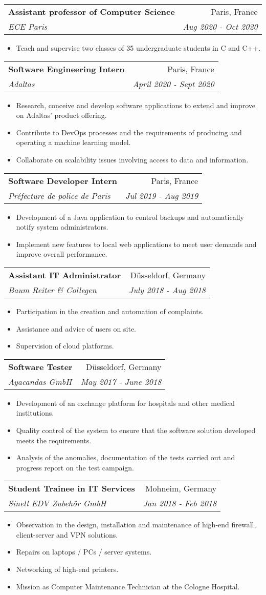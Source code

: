 \documentclass[a4paper,11pt]{article}
\makeatletter
\newcommand{\resumeItem}[2]{
  \item\small{
    \textbf{#1}{ #2 \vspace{-2pt}}
  }
}
\newcommand{\resumeSubheading}[4]{
  \vspace{-1pt}\item
    \begin{tabular*}{0.97\textwidth}{l@{\extracolsep{\fill}}r}
      \textbf{#1} & #2 \\
      \textit{\small#3} & \textit{\small #4} \\
    \end{tabular*}\vspace{-5pt}
}
\newcommand{\resumeItemListStart}{\begin{itemize}}
\newcommand{\resumeItemListEnd}{\end{itemize}\vspace{-5pt}}
\makeatother
\begin{document}
      \resumeSubheading
      {Assistant professor of Computer Science}{Paris, France}
      {ECE Paris}{Aug 2020 - Oct 2020}
      \resumeItemListStart
        \resumeItem{}
          {Teach and supervise two classes of 35 undergraduate students in C and C++.}
      \resumeItemListEnd
      
    \resumeSubheading
      {Software Engineering Intern}{Paris, France}
      {Adaltas}{April 2020 - Sept 2020}
      \resumeItemListStart
        \resumeItem{}
          {Research, conceive and develop software applications to extend and improve on Adaltas' product offering.}
        \resumeItem{}
          {Contribute to DevOps processes and the requirements of producing and operating a machine learning model.}
        \resumeItem{}
          {Collaborate on scalability issues involving access to data and information.}
      \resumeItemListEnd
  
    \resumeSubheading
      {Software Developer Intern}{Paris, France}
      {Préfecture de police de Paris}{Jul 2019 - Aug 2019}
      \resumeItemListStart
        \resumeItem{}
          {Development of a Java application to control backups and automatically notify system administrators.}
        \resumeItem{}
          {Implement new features to local web applications to meet user demands and improve overall performance.}
      \resumeItemListEnd

    \resumeSubheading
      {Assistant IT Administrator}{Düsseldorf, Germany}
      {Baum Reiter \& Collegen}{July 2018 - Aug 2018}
      \resumeItemListStart
        \resumeItem{}
          {Participation in the creation and automation of complaints.}
        \resumeItem{}
          {Assistance and advice of users on site.}
        \resumeItem{}
          {Supervision of cloud platforms.}
      \resumeItemListEnd

    \resumeSubheading
      {Software Tester}{Düsseldorf, Germany}
      {Ayacandas GmbH}{May 2017 - June 2018}
      \resumeItemListStart
        \resumeItem{}
          {Development of an exchange platform for hospitals and other medical institutions.}
        \resumeItem{}
          {Quality control of the system to ensure that the software solution developed meets the requirements.}
        \resumeItem{}
          {Analysis of the anomalies, documentation of the tests carried out and progress report on the test campaign.}
      \resumeItemListEnd

      \resumeSubheading
      {Student Trainee in IT Services}{Mohneim, Germany}
      {Sinell EDV Zubehör GmbH}{Jan 2018 - Feb 2018}
      \resumeItemListStart
        \resumeItem{}
          {Observation in the design, installation and maintenance of high-end firewall, client-server and VPN solutions.}
        \resumeItem{}
          {Repairs on laptops / PCs / server systems.}
        \resumeItem{}
          {Networking of high-end printers.}
        \resumeItem{}
          {Mission as Computer Maintenance Technician at the Cologne Hospital.}
      \resumeItemListEnd
      
\end{document}
